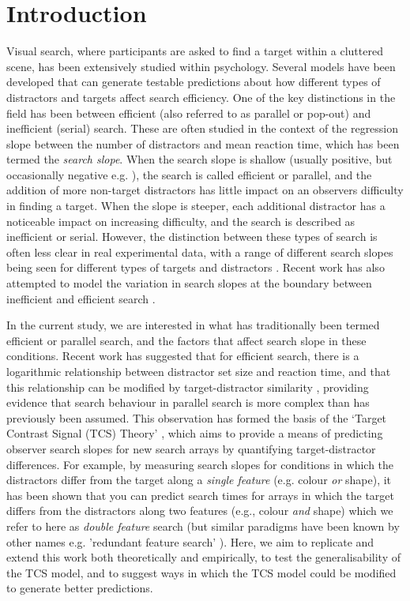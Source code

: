 \documentclass[preprint,12pt,authoryear]{elsarticle}
\begin{document}
\section{Introduction}
\label{intro}

Visual search, where participants are asked to find a target within a cluttered scene, has been extensively studied within psychology. Several models have been developed that can generate testable predictions about how different types of distractors and targets affect search efficiency. One of the key distinctions in the field has been between efficient (also referred to as parallel or pop-out) and inefficient (serial) search. These are often studied in the context of the regression slope between the number of distractors and mean reaction time, which has been termed the \textit{search slope}. When the search slope is shallow (usually positive, but occasionally negative e.g. \citep{rangelov2017failure}), the search is called efficient or parallel, and the addition of more non-target distractors has little impact on an observers difficulty in finding a target. When the slope is steeper, each additional distractor has a noticeable impact on increasing difficulty, and the search is described as inefficient or serial. However, the distinction between these types of search is often less clear in real experimental data, with a range of different search slopes being seen for different types of targets and distractors \citep{duncan1989visual,cave1990modeling,wolfe1998can,liesefeld2016search}. Recent work has also attempted to model the variation in search slopes at the boundary between inefficient and efficient search \citep{liesefeld2016search}.

In the current study, we are interested in what has traditionally been termed efficient or parallel search, and the factors that affect search slope in these conditions. Recent work has suggested that for efficient search, there is a logarithmic relationship between distractor set size and reaction time, and that this relationship can be modified by target-distractor similarity \citep{buetti2016towards}, providing evidence that search behaviour in parallel search is more complex than has previously been assumed. This observation has formed the basis of the `Target Contrast Signal (TCS) Theory' \citep{lleras2020target}, which aims to provide a means of predicting observer search slopes for new search arrays by quantifying target-distractor differences. For example, by measuring search slopes for conditions in which the distractors differ from the target along a \textit{single feature} (e.g. colour \textit{or} shape), it has been shown that you can predict search times for arrays in which the target differs from the distractors along two features (e.g., colour \textit{and} shape) which we refer to here as \textit{double feature} search \citep{buetti2019predicting} (but similar paradigms have been known by other names e.g. 'redundant feature search' \citep{krummenacher2012dynamic, mordkoff1991interactive}). Here, we aim to replicate and extend this work both theoretically and empirically, to test the generalisability of the TCS model, and to suggest ways in which the TCS model could be modified to generate better predictions.
\end{document}
